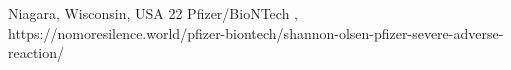                 {
                  Niagara, Wisconsin, USA
                }
                {
                  22
                }
                {
                  Pfizer/BioNTech
                }
                {
                  ,
                }
                {
                }
                {
                  https://nomoresilence.world/pfizer-biontech/shannon-olsen-pfizer-severe-adverse-reaction/
                }


